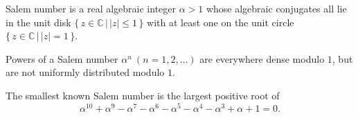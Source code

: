 \documentclass[12pt]{article}
\begin{document}
Salem number is a real algebraic integer $\alpha>1$ whose algebraic conjugates all lie in the  unit disk $\{\,z\in\mathbb{C} \,\big|\, |z|\leq 1\,\}$ with at least one on the unit circle $\{\,z\in\mathbb{C}\,\big|\,|z|= 1\,\}$.

Powers of a Salem number $\alpha^n\ (n=1,2,\dotsc)$ are everywhere dense modulo $1$, but are not uniformly distributed modulo $1$.

The smallest known Salem number is the largest positive root of
\begin{equation*}
\alpha^{10}+\alpha^9-\alpha^7-\alpha^6-\alpha^5-\alpha^4-\alpha^3+\alpha+1=0.
\end{equation*}
\end{document}
